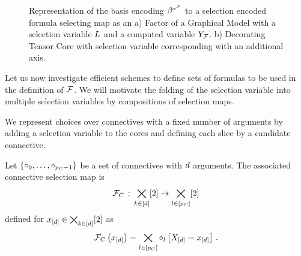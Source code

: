 \begin{figure}[t]
    \begin{center}
        
    \end{center}
    \caption{Representation of the basis encoding $\beta^{\sigma^{\mathcal{F}}}$ to a selection encoded formula selecting map as an
    a) Factor of a Graphical Model with a selection variable $L$ and a computed variable $Y_{\mathcal{F}}$.
    b) Decorating Tensor Core with selection variable corresponding with an additional axis.}
    \label{fig:formulaSelectionMap}
\end{figure}



Let us now investigate efficient schemes to define sets of formulas to be used in the definition of $\mathcal{F}$.
We will motivate the folding of the selection variable into multiple selection variables by compositions of selection maps.



We represent choices over connectives with a fixed number of arguments by adding a selection variable to the cores and defining each slice by a candidate connective.

\begin{definition}
    \label{def:connectiveSelector}
    Let $\{\circ_{0},\ldots,\circ_{p_{C}-1}\}$ be a set of connectives with $d$ arguments.
    The associated connective selection map is
    \begin{align*}
        \mathcal{F}_{C}\,:\, \bigtimes_{k\in[d]}[2] \rightarrow \bigtimes_{l\in[p_{C}]}[2]
    \end{align*}
    defined for $x_{[d]}\in\bigtimes_{k\in[d]}[2]$ as
    \begin{align*}
        \mathcal{F}_{C}\left(x_{[d]}\right) = \bigtimes_{l\in[p_{C}]} \circ_{l}\left[X_{[d]}=x_{[d]}\right] \, .
    \end{align*}
\end{definition}

